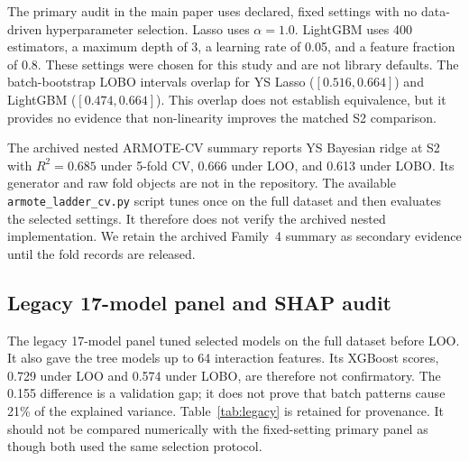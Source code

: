 \documentclass[a4paper,11pt]{article}
\begin{document}
The primary audit in the main paper uses declared, fixed settings with no data-driven hyperparameter selection. Lasso uses $\alpha=1.0$. LightGBM uses 400 estimators, a maximum depth of 3, a learning rate of 0.05, and a feature fraction of 0.8. These settings were chosen for this study and are not library defaults. The batch-bootstrap LOBO intervals overlap for YS Lasso ($[0.516,0.664]$) and LightGBM ($[0.474,0.664]$). This overlap does not establish equivalence, but it provides no evidence that non-linearity improves the matched S2 comparison.

The archived nested ARMOTE-CV summary reports YS Bayesian ridge at S2 with $R^2=0.685$ under 5-fold CV, 0.666 under LOO, and 0.613 under LOBO. Its generator and raw fold objects are not in the repository. The available \texttt{armote\_ladder\_cv.py} script tunes once on the full dataset and then evaluates the selected settings. It therefore does not verify the archived nested implementation. We retain the archived Family~4 summary as secondary evidence until the fold records are released.

\subsection{Legacy 17-model panel and SHAP audit}

The legacy 17-model panel tuned selected models on the full dataset before LOO. It also gave the tree models up to 64 interaction features. Its XGBoost scores, 0.729 under LOO and 0.574 under LOBO, are therefore not confirmatory. The 0.155 difference is a validation gap; it does not prove that batch patterns cause 21\% of the explained variance. Table~\ref{tab:legacy} is retained for provenance. It should not be compared numerically with the fixed-setting primary panel as though both used the same selection protocol.
\end{document}
